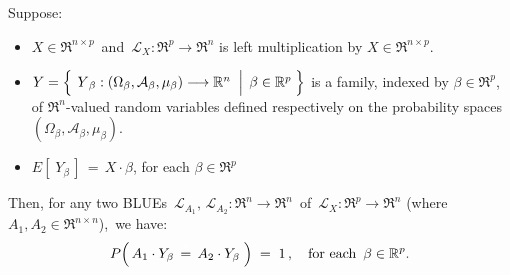 
\vskip 1.0cm
\begin{theorem}
\label{BLUEuniquness}
\mbox{}\vskip 0.1cm\noindent
Suppose:
\begin{itemize}
\item
	$X \in \Re^{n \times p}$\, and 
	\,$\mathcal{L}_{X} : \Re^{p} \longrightarrow \Re^{n}$ is left multiplication by $X \in \Re^{n \times p}$.
\item
	$Y = \left\{\;
		\left.
		\overset{{\color{white}.}}{Y}_{\beta} : (\Omega_{\beta},\mathcal{A}_{\beta},\mu_{\beta}) \longrightarrow \Re^{n}
		\;\;\right\vert\;
		\beta \in \Re^{p}
		\;\right\}$
	is a family, indexed by $\beta \in \Re^{p}$,
	of $\Re^{n}$-valued random variables defined respectively on the
	probability spaces $(\Omega_{\beta},\mathcal{A}_{\beta},\mu_{\beta})$.
\item
	$E\!\left[\;Y_{\beta}\,\right] \,=\, X \cdot \beta$, for each $\beta \in \Re^{p}$
\end{itemize}
Then, for any two BLUEs 
\,$\mathcal{L}_{A_{1}},\, \mathcal{L}_{A_{2}} : \Re^{n} \longrightarrow \Re^{n}$\,
of
\,$\mathcal{L}_{X} : \Re^{p} \longrightarrow \Re^{n}$ (where $A_{1}, A_{2} \in \Re^{n \times n}$),\,
we have:
\begin{equation*}
P\!\left(\, A_{1} \cdot Y_{\beta} \,\overset{{\color{white}+}}{=}\, A_{2} \cdot Y_{\beta} \;\right) \;=\; 1\,,
\quad
\textnormal{for each \,$\beta \in \Re^{p}$}.
\end{equation*}
\begin{comment}
\begin{equation*}
\begin{array}{c}
	\textnormal{each of \,$\mathcal{L}_{A_{1}},\, \mathcal{L}_{A_{2}} : \Re^{n} \longrightarrow \Re^{n}$}
	\\
	\textnormal{is a BLUE of \,$\overset{{\color{white}+}}{\mathcal{L}}_{X} : \Re^{p} \longrightarrow \Re^{n}$}
	\\
	{\color{white}\overset{-}{\vert}}
	\textnormal{in terms of \,$Y = \{\,Y_{\beta}\,\}_{\beta\in\Re^{p}}$}
	{\color{white}\overset{-}{\vert}}
	\end{array}
\;\;\quad\Longrightarrow\quad\;\;
\begin{array}{c}
	P\!\left(\, A_{1} \cdot Y_{\beta} \,\overset{{\color{white}+}}{=}\, A_{2} \cdot Y_{\beta} \;\right) \;=\; 1\,,
	\\
	{\color{white}\overset{.}{\Re}}
	\textnormal{for each \,$\beta \in \Re^{p}$.}
	{\color{white}\overset{.}{\Re}}
	\end{array}
\end{equation*}
\end{comment}
\end{theorem}
